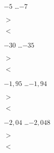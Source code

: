 \begin{QCM}
\begin{GroupeQCM}
    
    \begin{exercice}
      $- 5$ \ldots $- 7$
      \begin{ChoixQCM}{4}
      \item $>$
      \item $<$
      \end{ChoixQCM}
\begin{corrige}
   \end{corrige}
    \end{exercice}
    
    
    \begin{exercice}
      $- 30$ \ldots $- 35$
      \begin{ChoixQCM}{4}
      \item $>$
      \item $<$
      \end{ChoixQCM}
\begin{corrige}
   \end{corrige}
    \end{exercice}
    
    
    \begin{exercice}
      $- 1,95$ \ldots $- 1,94$
      \begin{ChoixQCM}{4}
      \item $>$
      \item $<$
      \end{ChoixQCM}
\begin{corrige}
   \end{corrige}
    \end{exercice}
    
    
    \begin{exercice}
      $- 2,04$ \ldots $- 2,048$
      \begin{ChoixQCM}{4}
      \item $>$
      \item $<$
      \end{ChoixQCM}
\begin{corrige}
   \end{corrige}
    \end{exercice} 

\end{GroupeQCM}
\end{QCM}

  